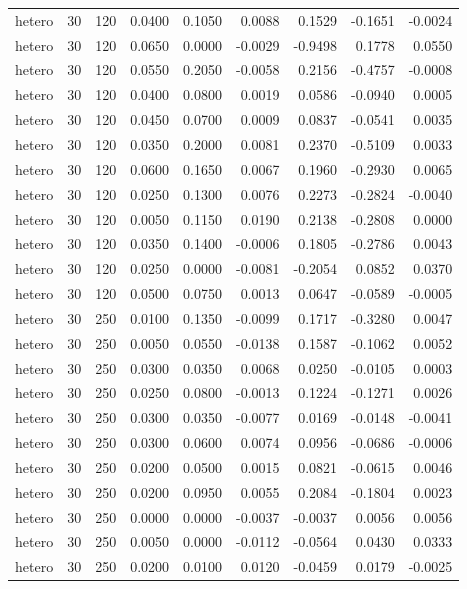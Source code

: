 \begin{tabular}{lrrrrrrrr}
hetero & 30 & 120 & 0.0400 & 0.1050 & 0.0088 & 0.1529 & -0.1651 & -0.0024 \\
hetero & 30 & 120 & 0.0650 & 0.0000 & -0.0029 & -0.9498 & 0.1778 & 0.0550 \\
hetero & 30 & 120 & 0.0550 & 0.2050 & -0.0058 & 0.2156 & -0.4757 & -0.0008 \\
hetero & 30 & 120 & 0.0400 & 0.0800 & 0.0019 & 0.0586 & -0.0940 & 0.0005 \\
hetero & 30 & 120 & 0.0450 & 0.0700 & 0.0009 & 0.0837 & -0.0541 & 0.0035 \\
hetero & 30 & 120 & 0.0350 & 0.2000 & 0.0081 & 0.2370 & -0.5109 & 0.0033 \\
hetero & 30 & 120 & 0.0600 & 0.1650 & 0.0067 & 0.1960 & -0.2930 & 0.0065 \\
hetero & 30 & 120 & 0.0250 & 0.1300 & 0.0076 & 0.2273 & -0.2824 & -0.0040 \\
hetero & 30 & 120 & 0.0050 & 0.1150 & 0.0190 & 0.2138 & -0.2808 & 0.0000 \\
hetero & 30 & 120 & 0.0350 & 0.1400 & -0.0006 & 0.1805 & -0.2786 & 0.0043 \\
hetero & 30 & 120 & 0.0250 & 0.0000 & -0.0081 & -0.2054 & 0.0852 & 0.0370 \\
hetero & 30 & 120 & 0.0500 & 0.0750 & 0.0013 & 0.0647 & -0.0589 & -0.0005 \\
hetero & 30 & 250 & 0.0100 & 0.1350 & -0.0099 & 0.1717 & -0.3280 & 0.0047 \\
hetero & 30 & 250 & 0.0050 & 0.0550 & -0.0138 & 0.1587 & -0.1062 & 0.0052 \\
hetero & 30 & 250 & 0.0300 & 0.0350 & 0.0068 & 0.0250 & -0.0105 & 0.0003 \\
hetero & 30 & 250 & 0.0250 & 0.0800 & -0.0013 & 0.1224 & -0.1271 & 0.0026 \\
hetero & 30 & 250 & 0.0300 & 0.0350 & -0.0077 & 0.0169 & -0.0148 & -0.0041 \\
hetero & 30 & 250 & 0.0300 & 0.0600 & 0.0074 & 0.0956 & -0.0686 & -0.0006 \\
hetero & 30 & 250 & 0.0200 & 0.0500 & 0.0015 & 0.0821 & -0.0615 & 0.0046 \\
hetero & 30 & 250 & 0.0200 & 0.0950 & 0.0055 & 0.2084 & -0.1804 & 0.0023 \\
hetero & 30 & 250 & 0.0000 & 0.0000 & -0.0037 & -0.0037 & 0.0056 & 0.0056 \\
hetero & 30 & 250 & 0.0050 & 0.0000 & -0.0112 & -0.0564 & 0.0430 & 0.0333 \\
hetero & 30 & 250 & 0.0200 & 0.0100 & 0.0120 & -0.0459 & 0.0179 & -0.0025 \\

\end{tabular}
